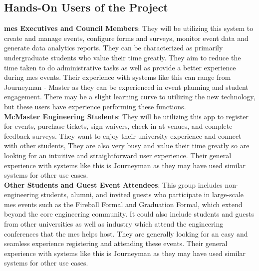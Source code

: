 \documentclass[12pt]{article}
\begin{document}
\subsection{Hands-On Users of the Project}
\textbf{\gls{mes} Executives and Council Members}: They will be utilizing this system to create and manage events,
configure forms and surveys, monitor event data and generate data analytics reports. They can be characterized as
primarily undergraduate students who value their time greatly. They aim to reduce the time taken to do administrative
tasks as well as provide a better experience during \gls{mes} events. Their experience with systems like this can range
from Journeyman - Master as they can be experienced in event planning and student engagement. There may be a slight
learning curve to utilizing the new technology, but these users have experience performing these functions.\\
\newline
\textbf{McMaster Engineering Students}: They will be utilizing this app to register for events, purchase tickets, sign
waivers, check in at venues, and complete feedback surveys. They want to enjoy their university experience and connect
with other students, They are also very busy and value their time greatly so are looking for an intuitive and
straightforward user experience. Their general experience with systems like this is Journeyman as they may have used
similar systems for other use cases. \\
\newline
\textbf{Other Students and Guest Event Attendees}: This group includes non-engineering students, alumni, and invited
guests who participate in large-scale \gls{mes} events such as the Fireball Formal and Graduation Formal, which extend
beyond the core engineering community. It could also include students and guests from other universities as well as
industry which attend the engineering conferences that the \gls{mes} helps host. They are generally looking for an easy
and seamless experience registering and attending these events. Their general experience with systems like this is
Journeyman as they may have used similar systems for other use cases.
\end{document}

